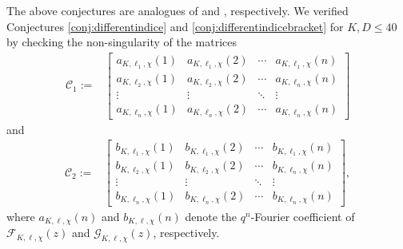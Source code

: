 \documentclass[11pt,letterpaper,reqno]{amsart}
\numberwithin{figure}{section}
\numberwithin{table}{section}
\theoremstyle{definition}
\theoremstyle{plain}
\theoremstyle{definition}
\theoremstyle{definition}
\theoremstyle{remark}
\numberwithin{equation}{section}
\theoremstyle{remark}
\begin{document}
The above conjectures are analogues of \cite[Conjecture 1.5]{oddperiods} and \cite[Conjecture 4.5]{evenperiods}, respectively. 
We verified Conjectures \ref{conj:differentindice} and \ref{conj:differentindicebracket} for $K,D\leq 40$ \cite{codefortwisted} by  checking the non-singularity of the matrices
\begin{align*}
   \mathcal{C}_1:=& \begin{bmatrix}
        a_{K,\ell_1,\chi}(1) & a_{K,\ell_1,\chi}(2) & \cdots & a_{K,\ell_1,\chi}(n) \\ a_{K,\ell_2,\chi}(1) & a_{K,\ell_2,\chi}(2) & \cdots & a_{K,\ell_n,\chi}(n) \\ \vdots &\vdots &\ddots &\vdots\\a_{K,\ell_n,\chi}(1) & a_{K,\ell_n,\chi}(2) & \cdots & a_{K,\ell_n,\chi}(n) 
    \end{bmatrix}\end{align*}
and    
    \begin{align*}
    \mathcal{C}_2:=&\begin{bmatrix}
        b_{K,\ell_1,\chi}(1) & b_{K,\ell_1,\chi}(2) & \cdots & b_{K,\ell_1,\chi}(n) \\ b_{K,\ell_2,\chi}(1) & b_{K,\ell_2,\chi}(2) & \cdots & b_{K,\ell_n,\chi}(n) \\ \vdots &\vdots &\ddots &\vdots\\b_{K,\ell_n,\chi}(1) & b_{K,\ell_n,\chi}(2) & \cdots & b_{K,\ell_n,\chi}(n) 
    \end{bmatrix},
\end{align*}
where $a_{K,\ell,\chi}(n)$ and $b_{K,\ell,\chi}(n)$ denote the $q^n$-Fourier coefficient of $\mathcal{F}_{K,\ell,\chi}(z)$ and $\mathcal{G}_{K,\ell,\chi}(z)$, respectively. 
\end{document}
